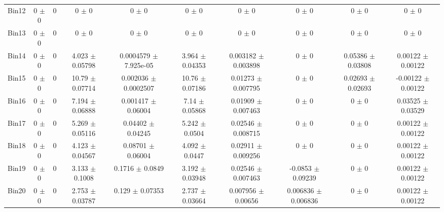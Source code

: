 \begin{tabular}{@{\extracolsep{4pt}}lccccccccc@{}}
     Bin12 & 0 $\pm$ 0 & 0 & 0 $\pm$ 0 & 0 $\pm$ 0 & 0 $\pm$ 0 & 0 $\pm$ 0 & 0 $\pm$ 0 & 0 $\pm$ 0 & 0 $\pm$ 0 \\ 
     Bin13 & 0 $\pm$ 0 & 0 & 0 $\pm$ 0 & 0 $\pm$ 0 & 0 $\pm$ 0 & 0 $\pm$ 0 & 0 $\pm$ 0 & 0 $\pm$ 0 & 0 $\pm$ 0 \\ 
     Bin14 & 0 $\pm$ 0 & 0 & 4.023 $\pm$ 0.05798 & 0.0004579 $\pm$ 7.925e-05 & 3.964 $\pm$ 0.04353 & 0.003182 $\pm$ 0.003898 & 0 $\pm$ 0 & 0.05386 $\pm$ 0.03808 & 0.00122 $\pm$ 0.00122 \\ 
     Bin15 & 0 $\pm$ 0 & 0 & 10.79 $\pm$ 0.07714 & 0.002036 $\pm$ 0.0002507 & 10.76 $\pm$ 0.07186 & 0.01273 $\pm$ 0.007795 & 0 $\pm$ 0 & 0.02693 $\pm$ 0.02693 & -0.00122 $\pm$ 0.00122 \\ 
     Bin16 & 0 $\pm$ 0 & 0 & 7.194 $\pm$ 0.06888 & 0.001417 $\pm$ 0.06004 & 7.14 $\pm$ 0.05868 & 0.01909 $\pm$ 0.007463 & 0 $\pm$ 0 & 0 $\pm$ 0 & 0.03525 $\pm$ 0.03529 \\ 
     Bin17 & 0 $\pm$ 0 & 0 & 5.269 $\pm$ 0.05116 & 0.04402 $\pm$ 0.04245 & 5.242 $\pm$ 0.0504 & 0.02546 $\pm$ 0.008715 & 0 $\pm$ 0 & 0 $\pm$ 0 & 0.00122 $\pm$ 0.00122 \\ 
     Bin18 & 0 $\pm$ 0 & 0 & 4.123 $\pm$ 0.04567 & 0.08701 $\pm$ 0.06004 & 4.092 $\pm$ 0.0447 & 0.02911 $\pm$ 0.009256 & 0 $\pm$ 0 & 0 $\pm$ 0 & 0.00122 $\pm$ 0.00122 \\ 
     Bin19 & 0 $\pm$ 0 & 0 & 3.133 $\pm$ 0.1008 & 0.1716 $\pm$ 0.0849 & 3.192 $\pm$ 0.03948 & 0.02546 $\pm$ 0.007463 & -0.0853 $\pm$ 0.09239 & 0 $\pm$ 0 & 0.00122 $\pm$ 0.00122 \\ 
     Bin20 & 0 $\pm$ 0 & 0 & 2.753 $\pm$ 0.03787 & 0.129 $\pm$ 0.07353 & 2.737 $\pm$ 0.03664 & 0.007956 $\pm$ 0.00656 & 0.006836 $\pm$ 0.006836 & 0 $\pm$ 0 & 0.00122 $\pm$ 0.00122 \\ 
\hline\hline
  \end{tabular}
